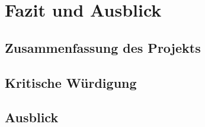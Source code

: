 \chapter{Fazit und Ausblick}


\section{Zusammenfassung des Projekts}

\section{Kritische Würdigung}

\section{Ausblick}
